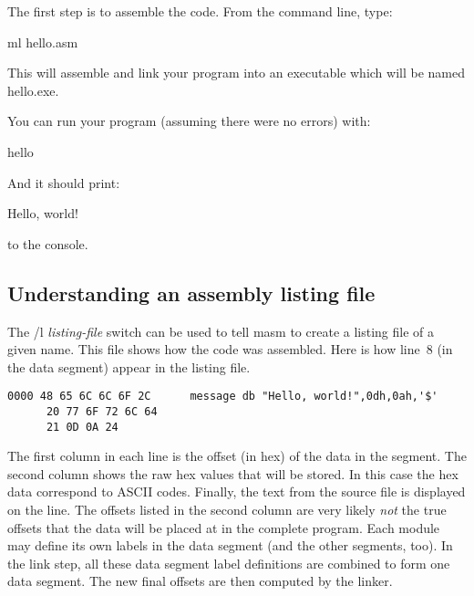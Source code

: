 The first step is to assemble the code. From the command line, type:
\begin{CodeQuote}
ml hello.asm
\end{CodeQuote}

This will assemble and link your program into an executable which will
be named hello.exe.

You can run your program (assuming there were no errors) with:
\begin{CodeQuote}
hello
\end{CodeQuote}

And it should print:
\begin{CodeQuote}
Hello, world!
\end{CodeQuote}
to the console. 


 {  %

\subsection{Understanding an assembly listing file }

The {\code /l {\em listing-file}} switch can be used to tell {\code
masm} to create a listing file of a given name. This file shows how
the code was assembled. Here is how line~8 (in the data
segment) appear in the listing file.

\begin{lstlisting}[language={[x86masm]Assembler},firstnumber=8]
0000 48 65 6C 6C 6F 2C	    message db "Hello, world!",0dh,0ah,'$'
      20 77 6F 72 6C 64
      21 0D 0A 24
 \end{lstlisting}%
The first column in each line is the
offset (in hex) of the data in the segment. The second column shows the
raw hex values that will be stored. In this case the hex data
correspond to ASCII codes. Finally, the text from the source file is
displayed on the line. The offsets listed in the second column are
very likely \emph{not} the true offsets that the data will be placed
at in the complete program.  Each module may define its own labels in
the data segment (and the other segments, too). In the link step, all these data segment label definitions
are combined to form one data segment. The new final offsets are then
computed by the linker.

}
